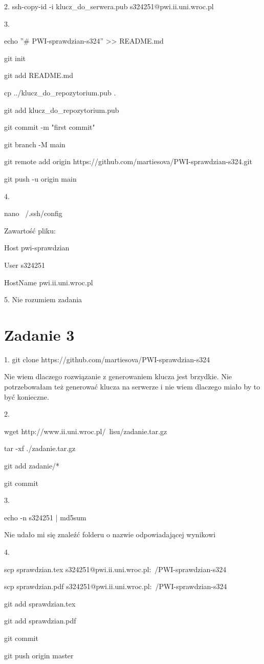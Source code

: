 \documentclass[a4paper]{article}
\begin{document}
2. ssh-copy-id -i klucz\_do\_serwera.pub s324251@pwi.ii.uni.wroc.pl

3.

echo ''\# PWI-sprawdzian-s324'' >> README.md

git init

git add README.md

cp ../klucz\_do\_repozytorium.pub .

git add klucz\_do\_repozytorium.pub

git commit -m "first commit"

git branch -M main

git remote add origin https://github.com/martiesova/PWI-sprawdzian-s324.git

git push -u origin main

4.

nano ~/.ssh/config

Zawartość pliku:

Host pwi-sprawdzian

\quad User s324251
        
\quad HostName pwi.ii.uni.wroc.pl

5. Nie rozumiem zadania

\section{Zadanie 3}
1. git clone https://github.com/martiesova/PWI-sprawdzian-s324

Nie wiem dlaczego rozwiązanie z generowaniem klucza jest brzydkie. Nie potrzebowałam też generować klucza na serwerze i nie wiem dlaczego miało by to być konieczne.

2.

wget http://www.ii.uni.wroc.pl/~lisu/zadanie.tar.gz

tar -xf ./zadanie.tar.gz

git add zadanie/*

git commit

3.

echo -n s324251 | md5sum

Nie udało mi się znaleźć folderu o nazwie odpowiadającej wynikowi

4.

scp sprawdzian.tex  s324251@pwi.ii.uni.wroc.pl:~/PWI-sprawdzian-s324

scp sprawdzian.pdf  s324251@pwi.ii.uni.wroc.pl:~/PWI-sprawdzian-s324

git add sprawdzian.tex

git add sprawdzian.pdf

git commit

git push origin master
\end{document}
